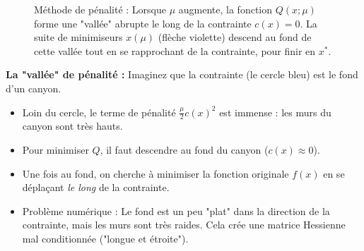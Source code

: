 \begin{figure}[H]
\centering
{}
\caption{Méthode de pénalité : Lorsque $\mu$ augmente, la fonction $Q(x;\mu)$ forme une "vallée" abrupte le long de la contrainte $c(x)=0$. La suite de minimiseurs $x(\mu)$ (flèche violette) descend au fond de cette vallée tout en se rapprochant de la contrainte, pour finir en $x^*$.}
\label{fig:penalty-valley}
\end{figure}

\begin{figureexplanation}
\textbf{La "vallée" de pénalité :}
Imaginez que la contrainte (le cercle bleu) est le fond d'un canyon.
\begin{itemize}
    \item Loin du cercle, le terme de pénalité $\frac{\mu}{2} c(x)^2$ est immense : les murs du canyon sont très hauts.
    \item Pour minimiser $Q$, il faut descendre au fond du canyon ($c(x) \approx 0$).
    \item Une fois au fond, on cherche à minimiser la fonction originale $f(x)$ en se déplaçant \emph{le long} de la contrainte.
    \item Problème numérique : Le fond est un peu "plat" dans la direction de la contrainte, mais les murs sont très raides. Cela crée une matrice Hessienne mal conditionnée ("longue et étroite").
\end{itemize}
\end{figureexplanation}

